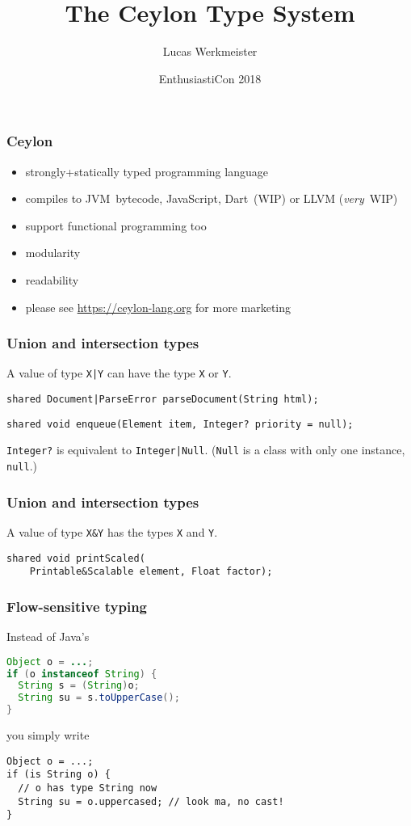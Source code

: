 \documentclass[aspectratio=169]{beamer}
\title{The Ceylon Type System}
\author{Lucas Werkmeister}
\date{EnthusiastiCon 2018}
\begin{document}
\frame{\titlepage}

\begin{frame}
  \frametitle{Ceylon}
  \begin{itemize}
  \item strongly+statically typed programming language
  \item compiles to JVM~bytecode, JavaScript, Dart~(WIP) or LLVM (\emph{very}~WIP)
  \item support functional programming too
  \item modularity
  \item readability
  \item please see \url{https://ceylon-lang.org} for more marketing
  \end{itemize}
\end{frame}

\begin{frame}[fragile]
  \frametitle{Union and intersection types}
  A value of type \lstinline{X|Y} can have the type \lstinline{X} or \lstinline{Y}.
  \pause
  \begin{lstlisting}
shared Document|ParseError parseDocument(String html);
  \end{lstlisting}
  \pause
  \begin{lstlisting}
shared void enqueue(Element item, Integer? priority = null);
  \end{lstlisting}
  \pause
  \lstinline{Integer?} is equivalent to \lstinline{Integer|Null}.
  (\lstinline{Null} is a class with only one instance, \lstinline{null}.)
\end{frame}

\begin{frame}[fragile]
  \frametitle{Union and intersection types}
  A value of type \lstinline{X&Y} has the types \lstinline{X} and \lstinline{Y}.
  \pause
  \begin{lstlisting}
shared void printScaled(
    Printable&Scalable element, Float factor);
  \end{lstlisting}
\end{frame}

\begin{frame}[fragile]
  \frametitle{Flow-sensitive typing}
  Instead of Java’s
  \begin{lstlisting}[language=java]
Object o = ...;
if (o instanceof String) {
  String s = (String)o;
  String su = s.toUpperCase();
}
  \end{lstlisting}
  \pause
  you simply write
  \begin{lstlisting}
Object o = ...;
if (is String o) {
  // o has type String now
  String su = o.uppercased; // look ma, no cast!
}
  \end{lstlisting}
\end{frame}
\end{document}
